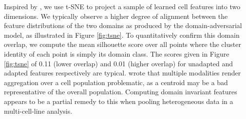 Inspired by \cite{ganin2016domain}, we use t-SNE \cite{maaten2008visualizing} to project a sample of learned cell features into two dimensions. We typically observe a higher degree of alignment between the feature distributions of the two domains as produced by the domain-adversarial model, as illustrated in Figure \ref{fig:tsne}. To quantitatively confirm this domain overlap, we compute the mean silhouette score over all points where the cluster identity of each point is simply its domain class. The scores given in Figure \ref{fig:tsne} of 0.11 (lower overlap)  and 0.01 (higher overlap) for unadapted and adapted features respectively are typical.\cite{altschuler2010cellular} wrote that multiple modalities render aggregation over a cell population problematic, as a centroid may be a bad representative of the overall population. Computing domain invariant features appears to be a partial remedy to this when pooling heterogeneous data in a multi-cell-line analysis.

